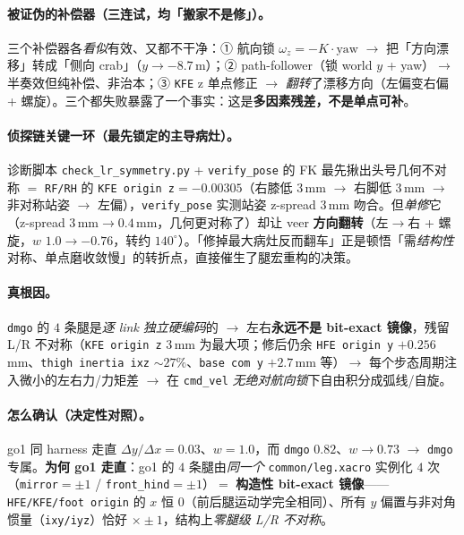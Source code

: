 \paragraph{被证伪的补偿器（三连试，均「搬家不是修」）。}
三个补偿器各\emph{看似}有效、又都不干净：① 航向锁 $\omega_z{=}-K\cdot\mathrm{yaw}$ $\to$ 把「方向漂移」转成「侧向 crab」（$y\to-8.7$\,m）；② path-follower（锁 world $y$ + yaw）$\to$ 半奏效但纯补偿、非治本；③ \texttt{KFE} z 单点修正 $\to$ \emph{翻转}了漂移方向（左偏变右偏 + 螺旋）。三个都失败暴露了一个事实：这是\textbf{多因素残差，不是单点可补}。

\paragraph{侦探链关键一环（最先锁定的主导病灶）。}
诊断脚本 \texttt{check\_lr\_symmetry.py} + \texttt{verify\_pose} 的 FK 最先揪出头号几何不对称 $=$ \texttt{RF/RH} 的 \texttt{KFE origin z}$=-0.00305$（右膝低 $3$\,mm $\to$ 右脚低 $3$\,mm $\to$ 非对称站姿 $\to$ 左偏），\texttt{verify\_pose} 实测站姿 z-spread $3$\,mm 吻合。但\emph{单修}它（z-spread $3$\,mm$\to0.4$\,mm，几何更对称了）却让 veer \textbf{方向翻转}（左$\to$右 + 螺旋，$w$ $1.0\to-0.76$，转约 $140^\circ$）。「修掉最大病灶反而翻车」正是顿悟「需\emph{结构性}对称、单点磨收敛慢」的转折点，直接催生了腿宏重构的决策。

\paragraph{真根因。}
\texttt{dmgo} 的 $4$ 条腿是\emph{逐 link 独立硬编码}的 $\to$ 左右\textbf{永远不是 bit-exact 镜像}，残留 L/R 不对称（\texttt{KFE origin z} $3$\,mm 为最大项；修后仍余 \texttt{HFE origin y} $+0.256$\,mm、\texttt{thigh inertia ixz} $\sim27\%$、\texttt{base com y} $+2.7$\,mm 等）$\to$ 每个步态周期注入微小的左右力/力矩差 $\to$ 在 \texttt{cmd\_vel} \emph{无绝对航向锁}下自由积分成弧线/自旋。

\paragraph{怎么确认（决定性对照）。}
go1 同 harness 走直 $\Delta y/\Delta x{=}0.03$、$w{=}1.0$，而 \texttt{dmgo} $0.82$、$w\to0.73$ $\to$ \texttt{dmgo} 专属。\textbf{为何 go1 走直}：go1 的 $4$ 条腿由\emph{同一个} \texttt{common/leg.xacro} 实例化 $4$ 次（\texttt{mirror}$=\pm1$ / \texttt{front\_hind}$=\pm1$）$=$ \textbf{构造性 bit-exact 镜像}——\texttt{HFE/KFE/foot origin} 的 $x$ 恒 $0$（前后腿运动学完全相同）、所有 $y$ 偏置与非对角惯量（\texttt{ixy/iyz}）恰好 $\times\pm1$，结构上\emph{零腿级 L/R 不对称}。

